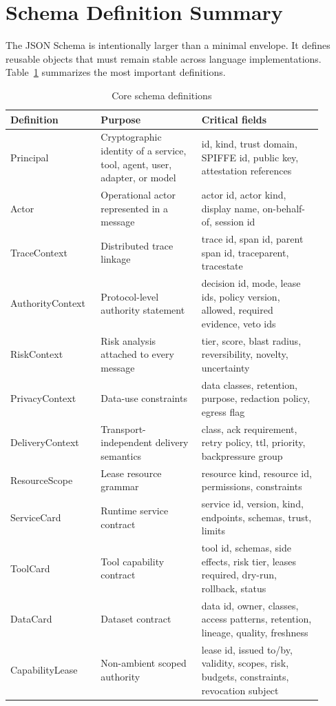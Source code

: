 \documentclass[10pt,journal,onecolumn]{IEEEtran}
\begin{document}
\section{Schema Definition Summary}
The JSON Schema is intentionally larger than a minimal envelope. It defines reusable objects that must remain stable across language implementations. Table~\ref{tab:schemaobjects} summarizes the most important definitions.
\begin{longtable}{@{}p{0.24\linewidth}p{0.30\linewidth}p{0.36\linewidth}@{}}
\caption{Core schema definitions}\label{tab:schemaobjects}\\
\toprule
Definition & Purpose & Critical fields \\
\midrule
Principal & Cryptographic identity of a service, tool, agent, user, adapter, or model & id, kind, trust domain, SPIFFE id, public key, attestation references \\
Actor & Operational actor represented in a message & actor id, actor kind, display name, on-behalf-of, session id \\
TraceContext & Distributed trace linkage & trace id, span id, parent span id, traceparent, tracestate \\
AuthorityContext & Protocol-level authority statement & decision id, mode, lease ids, policy version, allowed, required evidence, veto ids \\
RiskContext & Risk analysis attached to every message & tier, score, blast radius, reversibility, novelty, uncertainty \\
PrivacyContext & Data-use constraints & data classes, retention, purpose, redaction policy, egress flag \\
DeliveryContext & Transport-independent delivery semantics & class, ack requirement, retry policy, ttl, priority, backpressure group \\
ResourceScope & Lease resource grammar & resource kind, resource id, permissions, constraints \\
ServiceCard & Runtime service contract & service id, version, kind, endpoints, schemas, trust, limits \\
ToolCard & Tool capability contract & tool id, schemas, side effects, risk tier, leases required, dry-run, rollback, status \\
DataCard & Dataset contract & data id, owner, classes, access patterns, retention, lineage, quality, freshness \\
CapabilityLease & Non-ambient scoped authority & lease id, issued to/by, validity, scopes, risk, budgets, constraints, revocation subject \\

\end{longtable}
\end{document}
